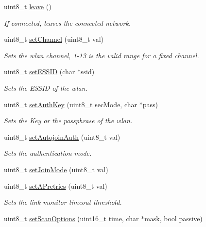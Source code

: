\begin{DoxyCompactItemize}
uint8\+\_\+t \hyperlink{class_wasp_w_i_f_i_a7c3793459cf4dfac7d062b54648660d4}{leave} ()
\begin{DoxyCompactList}\small\item\em If connected, leaves the connected network. \end{DoxyCompactList}\item 
uint8\+\_\+t \hyperlink{class_wasp_w_i_f_i_ab05574e0cb8dd1cac2a2546ccf9ef0e0}{set\+Channel} (uint8\+\_\+t val)
\begin{DoxyCompactList}\small\item\em Sets the wlan channel, 1-\/13 is the valid range for a fixed channel. \end{DoxyCompactList}\item 
uint8\+\_\+t \hyperlink{class_wasp_w_i_f_i_ae569b2fc6a4b047e9b4c079dbe85eaa9}{set\+E\+S\+S\+ID} (char $\ast$ssid)
\begin{DoxyCompactList}\small\item\em Sets the E\+S\+S\+ID of the wlan. \end{DoxyCompactList}\item 
uint8\+\_\+t \hyperlink{class_wasp_w_i_f_i_a997a23f867bf5b3cfae9e96949ddd2b3}{set\+Auth\+Key} (uint8\+\_\+t sec\+Mode, char $\ast$pass)
\begin{DoxyCompactList}\small\item\em Sets the Key or the passphrase of the wlan. \end{DoxyCompactList}\item 
uint8\+\_\+t \hyperlink{class_wasp_w_i_f_i_a034c0cf54e592cea0dde3074f81cb0f5}{set\+Autojoin\+Auth} (uint8\+\_\+t val)
\begin{DoxyCompactList}\small\item\em Sets the authentication mode. \end{DoxyCompactList}\item 
uint8\+\_\+t \hyperlink{class_wasp_w_i_f_i_a9d9dd5a231d8cb446034598f398b358d}{set\+Join\+Mode} (uint8\+\_\+t val)
\item 
uint8\+\_\+t \hyperlink{class_wasp_w_i_f_i_a2bd316a7a19257e07deadd6262a08ad7}{set\+A\+Pretries} (uint8\+\_\+t val)
\begin{DoxyCompactList}\small\item\em Sets the link monitor timeout threshold. \end{DoxyCompactList}\item 
uint8\+\_\+t \hyperlink{class_wasp_w_i_f_i_ad15ad4c4f2b23c29ef3163e1eff736ca}{set\+Scan\+Options} (uint16\+\_\+t time, char $\ast$mask, bool passive)

\end{DoxyCompactItemize}
